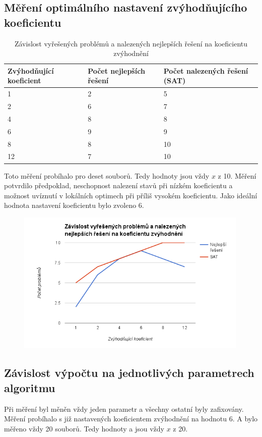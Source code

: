 \documentclass[10pt,a4paper]{article}
\begin{document}
\subsection{Měření optimálního nastavení zvýhodňujícího koeficientu}

\begin{table}[H]
\centering
  \begin{tabular}{ |l|l|l|}
  \hline
  Zvýhodňující koeficient & Počet nejlepších řešení & Počet nalezených řešení (SAT)\\
  \hline
    1  & 2 & 5  \\
    2  & 6 & 7  \\
    4  & 8 & 8  \\
    6  & 9 & 9  \\
    8  & 8 & 10 \\
    12 & 7 & 10 \\  
  \hline
  \end{tabular}
  \caption{Závislost vyřešených problémů a nalezených nejlepších řešení na koeficientu zvýhodnění}
\end{table}

Toto měření probíhalo pro deset souborů. Tedy hodnoty jsou vždy $x$ z 10. Měření potvrdilo předpoklad, neschopnost nalezení  stavů při nízkém koeficientu a možnost uvíznutí v lokálních optimech při příliš vysokém koeficientu. Jako ideální hodnota nastavení koeficientu bylo zvoleno 6.

\begin{figure}[H]\centering
 \includegraphics[width=0.99\textwidth]{1}
\end{figure}

\subsection{Závislost výpočtu na jednotlivých parametrech algoritmu}
Při měření byl měněn vždy jeden parametr a všechny ostatní byly zafixovány. Měření probíhalo s již nastavených koeficientem zvýhodnění na hodnotu 6. A bylo měřeno vždy 20 souborů. Tedy hodnoty  a  jsou vždy $x$ z 20.
\end{document}
